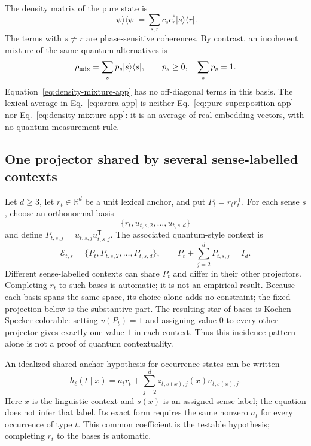 \documentclass[
  aps,
  reprint,
  superscriptaddress,
  floatfix,
  nofootinbib,
  longbibliography
]{revtex4-2}
\newcommand{\R}{\mathbb{R}}
\newcommand{\T}{^{\mathsf T}}
\begin{document}
The density matrix of the pure state is
\begin{equation}
 |\psi\rangle\langle\psi|
 =\sum_{s,r}c_s c_r^*|s\rangle\langle r|.
 \label{eq:pure-density-app}
\end{equation}
The terms with $s\ne r$ are phase-sensitive coherences.  By contrast, an
incoherent mixture of the same quantum alternatives is
\begin{equation}
 \rho_{\rm mix}=\sum_s p_s|s\rangle\langle s|,
 \qquad p_s\geq0,\quad\sum_s p_s=1.
 \label{eq:density-mixture-app}
\end{equation}
Equation~\eqref{eq:density-mixture-app} has no off-diagonal terms in this
basis.  The lexical average in Eq.~\eqref{eq:arora-app} is neither
Eq.~\eqref{eq:pure-superposition-app} nor
Eq.~\eqref{eq:density-mixture-app}: it is an average of real embedding
vectors, with no quantum measurement rule.

\subsection{One projector shared by several sense-labelled contexts}

Let $d\geq3$, let $r_t\in\R^d$ be a unit lexical anchor, and put
$P_t=r_t r_t\T$.  For each sense $s$, choose an orthonormal basis
\begin{equation}
 \{r_t,u_{t,s,2},\ldots,u_{t,s,d}\}
 \label{eq:residual-basis-app}
\end{equation}
and define $P_{t,s,j}=u_{t,s,j}u_{t,s,j}\T$.  The associated quantum-style
context is
\begin{equation}
 \mathcal E_{t,s}
 =\{P_t,P_{t,s,2},\ldots,P_{t,s,d}\},
 \qquad
 P_t+\sum_{j=2}^{d}P_{t,s,j}=I_d.
 \label{eq:context-hyperedge-app}
\end{equation}
Different sense-labelled contexts can share $P_t$ and differ in their other
projectors.  Completing $r_t$ to such bases is automatic; it is not an
empirical result.  Because each basis spans the same space, its choice alone
adds no constraint; the fixed projection below is the substantive part.
The resulting star of bases is Kochen--Specker colorable: setting
$v(P_t)=1$ and assigning value $0$ to every other projector gives exactly one
value $1$ in each context.  Thus this incidence pattern alone is not a proof
of quantum contextuality.

An idealized shared-anchor hypothesis for occurrence states can be written
\begin{equation}
 h_\ell(t\mid x)
 =a_t r_t+\sum_{j=2}^{d}z_{t,s(x),j}(x)u_{t,s(x),j} .
 \label{eq:shared-anchor-app}
\end{equation}
Here $x$ is the linguistic context and $s(x)$ is an assigned sense label; the
equation does not infer that label.  Its exact form requires the same
nonzero $a_t$ for every occurrence of type $t$.  This common coefficient is
the testable hypothesis; completing $r_t$ to the bases is automatic.
\end{document}
